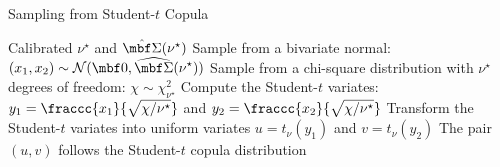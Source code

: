 \begin{algorithm}[H]
\label{alg:sampling_student-t}
\caption{Sampling from Student-$t$ Copula}
\begin{algorithmic}[1]
\Require Calibrated $\nu^\star$ and $\hat{\mbf \Sigma}(\nu^\star)$ %
\State Sample from a bivariate normal: $\displaystyle (x_1, x_2) \sim \mathcal{N}(\mbf 0, \widehat{\mbf \Sigma}(\nu^{\star}))$ 
\State Sample from a chi-square distribution with $\nu^\star$ degrees of freedom: $\displaystyle \chi \sim \chi^2_{\nu^\star}$
\State Compute the Student-$t$ variates: $y_1 = \fraccc{x_1}{\sqrt{\chi/\nu^{\star}}}$ and $y_2 = \fraccc{x_2}{\sqrt{\chi/\nu^{\star}}}$
\State Transform the Student-$t$ variates into uniform variates %
$u = t_{\nu}(y_1)$ and $v = t_{\nu}(y_2)$ 
\Ensure The pair $(u,v)$ follows the Student-$t$ copula distribution
\end{algorithmic}
\end{algorithm}
